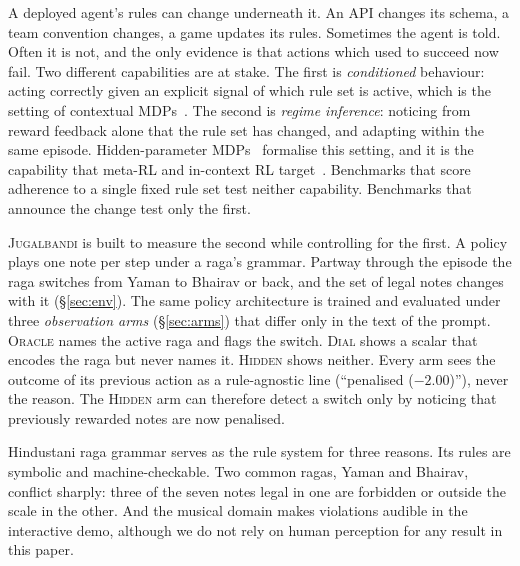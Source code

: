\documentclass[11pt]{article}
\newcommand{\env}{\textsc{Jugalbandi}}
\newcommand{\hidden}{\textsc{Hidden}}
\newcommand{\dial}{\textsc{Dial}}
\newcommand{\oracle}{\textsc{Oracle}}
\begin{document}
A deployed agent's rules can change underneath it. An API changes its schema, a team convention changes, a game updates its rules. Sometimes the agent is told. Often it is not, and the only evidence is that actions which used to succeed now fail. Two different capabilities are at stake. The first is \emph{conditioned} behaviour: acting correctly given an explicit signal of which rule set is active, which is the setting of contextual MDPs~\citep{hallak2015cmdp}. The second is \emph{regime inference}: noticing from reward feedback alone that the rule set has changed, and adapting within the same episode. Hidden-parameter MDPs~\citep{doshivelez2013hipmdp} formalise this setting, and it is the capability that meta-RL and in-context RL target~\citep{duan2016rl2,wang2016learning,laskin2022ad,lee2023dpt}. Benchmarks that score adherence to a single fixed rule set test neither capability. Benchmarks that announce the change test only the first.

\env{} is built to measure the second while controlling for the first. A policy plays one note per step under a raga's grammar. Partway through the episode the raga switches from Yaman to Bhairav or back, and the set of legal notes changes with it (\S\ref{sec:env}). The same policy architecture is trained and evaluated under three \emph{observation arms} (\S\ref{sec:arms}) that differ only in the text of the prompt. \oracle{} names the active raga and flags the switch. \dial{} shows a scalar that encodes the raga but never names it. \hidden{} shows neither. Every arm sees the outcome of its previous action as a rule-agnostic line (``penalised ($-2.00$)''), never the reason. The \hidden{} arm can therefore detect a switch only by noticing that previously rewarded notes are now penalised.

Hindustani raga grammar serves as the rule system for three reasons. Its rules are symbolic and machine-checkable. Two common ragas, Yaman and Bhairav, conflict sharply: three of the seven notes legal in one are forbidden or outside the scale in the other. And the musical domain makes violations audible in the interactive demo, although we do not rely on human perception for any result in this paper.
\end{document}
